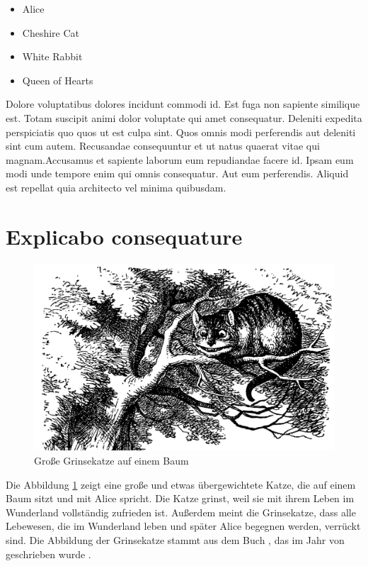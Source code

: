 \documentclass[12pt, a4paper]{article}
\newcommand{\verbcite}[2]{\autocite[][S. #1]{#2}}
\begin{document}
\begin{itemize}
    \item Alice
    \item Cheshire Cat
    \item White Rabbit
    \item Queen of Hearts
\end{itemize}

Dolore voluptatibus dolores incidunt commodi id. Est fuga non sapiente similique est. Totam suscipit animi dolor voluptate qui amet consequatur. Deleniti expedita perspiciatis quo quos ut est culpa sint. Quos omnis modi perferendis aut deleniti sint cum autem. Recusandae consequuntur et ut natus quaerat vitae qui magnam.Accusamus et sapiente laborum eum repudiandae facere id. Ipsam eum modi unde tempore enim qui omnis consequatur. Aut eum perferendis. Aliquid est repellat quia architecto vel minima quibusdam.

\section{Explicabo consequature}

\begin{figure}
    \centering
    \includegraphics{cheshire_cat}
    \caption{Große Grinsekatze auf einem Baum \verbcite{31}{carroll1865}}
    \label{fig:fat_cat}
\end{figure}

Die Abbildung \ref{fig:fat_cat} zeigt eine große und etwas übergewichtete Katze, die auf einem Baum sitzt und mit Alice spricht. Die Katze grinst, weil sie mit ihrem Leben im Wunderland vollständig zufrieden ist. Außerdem meint die Grinsekatze, dass alle Lebewesen, die im Wunderland leben und später Alice begegnen werden, verrückt sind. Die Abbildung der Grinsekatze stammt aus dem Buch , das im Jahr \citeyear{carroll1865} von \citeauthor{carroll1865} geschrieben wurde \autocite{carroll1865}.
\end{document}
